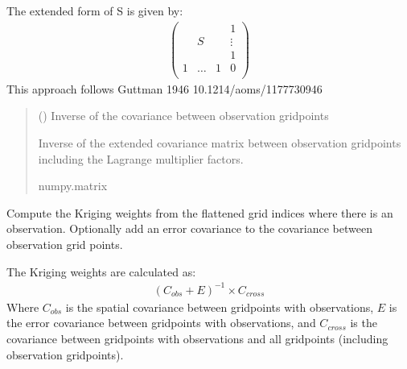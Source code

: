 \documentclass[letterpaper,10pt,english]{sphinxmanual}
\begin{document}
\begin{fulllineitems}
\begin{fulllineitems}
\sphinxAtStartPar
The extended form of S is given by:
\begin{equation*}
\begin{split}\begin{pmatrix}
&   & & 1 \\
& S & & \vdots \\
&   & & 1 \\
1 & \dots & 1 & 0 \\
\end{pmatrix}\end{split}
\end{equation*}
\sphinxAtStartPar
This approach follows Guttman 1946 10.1214/aoms/1177730946
\begin{quote}\begin{description}
\sphinxAtStartPar
{} () \textendash{} Inverse of the covariance between observation grid\sphinxhyphen{}points

\sphinxAtStartPar
Inverse of the extended covariance matrix between observation
grid\sphinxhyphen{}points including the Lagrange multiplier factors.

\sphinxAtStartPar
numpy.matrix

\end{description}\end{quote}

\end{fulllineitems}


\begin{fulllineitems}
\label{\detokenize{kriging:glomar_gridding.kriging.OrdinaryKriging.get_kriging_weights}}
\pysigstartsignatures
\pysiglinewithargsret
{}
{\sphinxparamcomma {}}
{}
\pysigstopsignatures
\sphinxAtStartPar
Compute the Kriging weights from the flattened grid indices where
there is an observation. Optionally add an error covariance to the
covariance between observation grid points.

\sphinxAtStartPar
The Kriging weights are calculated as:
\begin{equation*}
\begin{split}(C_{obs} + E)^{-1} \times C_{cross}\end{split}
\end{equation*}
\sphinxAtStartPar
Where \(C_{obs}\) is the spatial covariance between grid\sphinxhyphen{}points
with observations, \(E\) is the error covariance between grid\sphinxhyphen{}points
with observations, and \(C_{cross}\) is the covariance between
grid\sphinxhyphen{}points with observations and all grid\sphinxhyphen{}points (including observation
grid\sphinxhyphen{}points).


\end{fulllineitems}
\end{fulllineitems}
\end{document}
